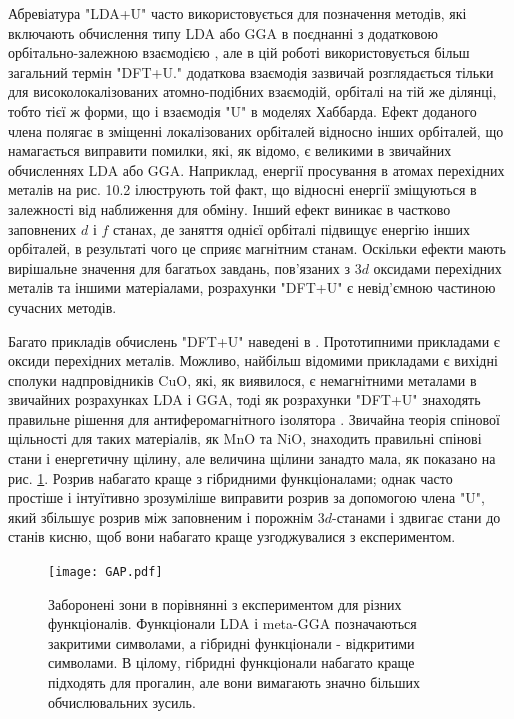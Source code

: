 Абревіатура "LDA+U" часто використовується для позначення методів, які включають обчислення типу LDA або GGA в поєднанні з додатковою орбітально-залежною взаємодією \cite{PhysRevB.44, Anisimov1997}, але в цій роботі використовується більш загальний термін "DFT+U." додаткова взаємодія зазвичай розглядається тільки для високолокалізованих атомно-подібних взаємодій, орбіталі на тій же ділянці, тобто тієї ж форми, що і взаємодія "U" в моделях Хаббарда. Ефект доданого члена полягає в зміщенні локалізованих орбіталей відносно інших орбіталей, що намагається виправити помилки, які, як відомо, є великими в звичайних обчисленнях LDA або GGA. Наприклад, енергії просування в атомах перехідних металів на рис. 10.2 ілюструють той факт, що відносні енергії зміщуються в залежності від наближення для обміну. Інший ефект виникає в частково заповнених $d$ і $f$ станах, де заняття однієї орбіталі підвищує енергію інших орбіталей, в результаті чого це сприяє магнітним станам. Оскільки ефекти мають вирішальне значення для багатьох завдань, пов'язаних з $3d$ оксидами перехідних металів та іншими матеріалами, розрахунки "DFT+U" є невід'ємною частиною сучасних методів.

Багато прикладів обчислень "DFT+U" наведені в \cite{Anisimov1997}. Прототипними прикладами є оксиди перехідних металів. Можливо, найбільш відомими прикладами є вихідні сполуки надпровідників CuO, які, як виявилося, є немагнітними металами в звичайних розрахунках LDA і GGA, тоді як розрахунки "DFT+U" знаходять правильне рішення для антиферомагнітного ізолятора \cite{Anisimov1997}. Звичайна теорія спінової щільності для таких матеріалів, як MnO та NiO, знаходить правильні спінові стани і енергетичну щілину, але величина щілини занадто мала, як показано на рис. \ref{fig:GAP}. Розрив набагато краще з гібридними функціоналами; однак часто простіше і інтуїтивно зрозуміліше виправити розрив за допомогою члена "U", який збільшує розрив між заповненим і порожнім $3d$-станами і здвигає стани до станів кисню, щоб вони набагато краще узгоджувалися з експериментом.

\begin{figure}[H]
	\centering
	\texttt{[image: GAP.pdf]}
	\caption{Заборонені зони в порівнянні з експериментом для різних функціоналів. Функціонали LDA і meta-GGA позначаються закритими символами, а гібридні функціонали - відкритими символами. В цілому, гібридні функціонали набагато краще підходять для прогалин, але вони вимагають значно більших обчислювальних зусиль.}
	\label{fig:GAP}
\end{figure}

